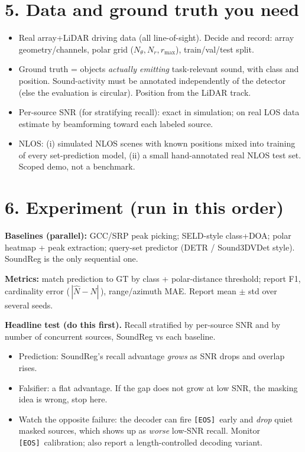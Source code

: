 \documentclass[10pt]{article}
\newcommand{\eos}{\texttt{[EOS]}}
\begin{document}
\section*{5. Data and ground truth you need}
\begin{itemize}
\item Real array+LiDAR driving data (all line-of-sight). Decide and record: array
geometry/channels, polar grid ($N_\theta,N_r,r_{\max}$), train/val/test split.
\item Ground truth = objects \emph{actually emitting} task-relevant sound, with
class and position. Sound-activity must be annotated independently of the detector
(else the evaluation is circular). Position from the LiDAR track.
\item Per-source SNR (for stratifying recall): exact in simulation; on real LOS
data estimate by beamforming toward each labeled source.
\item NLOS: (i) simulated NLOS scenes with known positions mixed into training of
every set-prediction model, (ii) a small hand-annotated real NLOS test set. Scoped
demo, not a benchmark.
\end{itemize}

\section*{6. Experiment (run in this order)}
\textbf{Baselines (parallel):} GCC/SRP peak picking; SELD-style class+DOA; polar
heatmap + peak extraction; query-set predictor (DETR / Sound3DVDet style). SoundReg
is the only sequential one.

\textbf{Metrics:} match prediction to GT by class + polar-distance threshold; report
F1, cardinality error (\,$|\hat N-N|$\,), range/azimuth MAE. Report mean $\pm$ std
over several seeds.

\textbf{Headline test (do this first).} Recall stratified by per-source SNR and by
number of concurrent sources, SoundReg vs each baseline.
\begin{itemize}
\item Prediction: SoundReg's recall advantage \emph{grows} as SNR drops and overlap
rises.
\item Falsifier: a flat advantage. If the gap does not grow at low SNR, the masking
idea is wrong, stop here.
\item Watch the opposite failure: the decoder can fire \eos\ early and \emph{drop}
quiet masked sources, which shows up as \emph{worse} low-SNR recall. Monitor \eos\
calibration; also report a length-controlled decoding variant.
\end{itemize}
\end{document}
